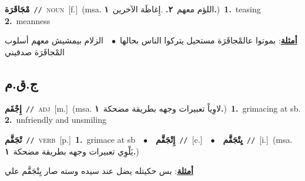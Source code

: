 \documentclass[10pt,a4paper,twoside]{article} %
\begin{document}
\begin{multicols}{2}
{\setlength\topsep{0pt}\textbf{\foreignlanguage{arabic}{مْجَاقَرَة}}\ {\color{gray}\texttt{//}\color{black}}\ \textsc{noun}\ [f.]\ \color{gray}(msa. \foreignlanguage{arabic}{اللؤم معهم}~\foreignlanguage{arabic}{\textbf{٢.}}  .\foreignlanguage{arabic}{إِغاظَة الآخرين}~\foreignlanguage{arabic}{\textbf{١.}})\color{black}\ \textbf{1.}~teasing  \textbf{2.}~meanness\  \begin{flushright}\color{gray}\foreignlanguage{arabic}{\textbf{\underline{\foreignlanguage{arabic}{أمثلة}}}: بموتوا عالمْجاقَرَة مستحيل يتركوا الناس بحالها\ $\bullet$\ \  الزلام بيمشيش معهم أسلوب المْجاقَرَة صدقيني}\end{flushright}\color{black}} \vspace{2mm}

\vspace{-3mm}
\subsection*{\color{blue}\foreignlanguage{arabic}{ج.ق.م}\color{blue}{}} 

{\setlength\topsep{0pt}\textbf{\foreignlanguage{arabic}{إِجْقَم}}\ {\color{gray}\texttt{//}\color{black}}\ \textsc{adj}\ [m.]\ \color{gray}(msa. \foreignlanguage{arabic}{لاوِياً تعبيرات وجهه بطريقة مضحكة}~\foreignlanguage{arabic}{\textbf{١.}})\color{black}\ \textbf{1.}~grimacing at sb.  \textbf{2.}~unfriendly and unsmiling\ } \vspace{2mm}

{\setlength\topsep{0pt}\textbf{\foreignlanguage{arabic}{تْجَقَّم}}\ {\color{gray}\texttt{//}\color{black}}\ \textsc{verb}\ [p.]\ \textbf{1.}~grimace at sb\ \ $\bullet$\ \ \setlength\topsep{0pt}\textbf{\foreignlanguage{arabic}{إِتْجَقَّم}}\ {\color{gray}\texttt{//}\color{black}}\ [c.]\ \ $\bullet$\ \ \setlength\topsep{0pt}\textbf{\foreignlanguage{arabic}{يِتْجَقَّم}}\ {\color{gray}\texttt{//}\color{black}}\ [i.]\ \color{gray}(msa. \foreignlanguage{arabic}{يَلْوِي تعبيرات وجهه بطريقة مضحكة}~\foreignlanguage{arabic}{\textbf{١.}})\color{black}\  \begin{flushright}\color{gray}\foreignlanguage{arabic}{\textbf{\underline{\foreignlanguage{arabic}{أمثلة}}}: بس حكيتله يضل عند سيده وسته صار يِتْجَقَّم علي}\end{flushright}\color{black}} \vspace{2mm}


\end{multicols}
\end{document}
